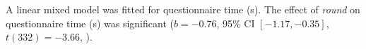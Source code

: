 A linear mixed model was fitted for questionnaire time (s).
The effect of \textit{round} on questionnaire time (s) was significant ($b = -0.76$, 95\% CI $[-1.17, -0.35]$, $t(332) = -3.66$, ).
